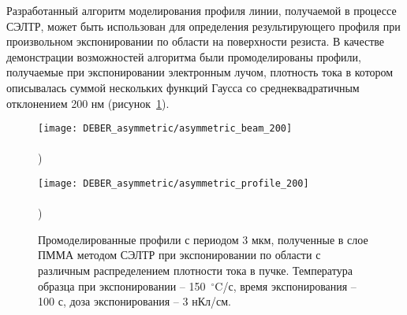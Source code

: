 Разработанный алгоритм моделирования профиля линии, получаемой в процессе СЭЛТР, может быть использован для определения результирующего профиля при произвольном экспонировании по области на поверхности резиста. В качестве демонстрации возможностей алгоритма были промоделированы профили, получаемые при экспонировании электронным лучом, плотность тока в котором описывалась суммой нескольких функций Гаусса со среднеквадратичным отклонением 200 нм (рисунок~\ref{fig:DEBER_multibeam}).

\begin{figure}[h]	
	\begin{minipage}{0.48\textwidth}
		\texttt{[image: DEBER\_asymmetric/asymmetric\_beam\_200]} \\
		\vspace{-12em} \\ ) \\ \vspace{12em}
	\end{minipage}
	\begin{minipage}{0.48\textwidth}
		\texttt{[image: DEBER\_asymmetric/asymmetric\_profile\_200]} \\
		\vspace{-12em} \\ ) \\ \vspace{12em}
	\end{minipage}
	\vspace{-3.5em}
	\caption{Промоделированные профили с периодом 3 мкм, полученные в слое ПММА методом СЭЛТР при экспонировании по области с различным распределением плотности тока в пучке. Температура образца при экспонировании -- 150~$^\circ$C/с, время экспонирования -- 100 с, доза экспонирования -- 3 нКл/см.}
	\label{fig:DEBER_multibeam}
\end{figure}
